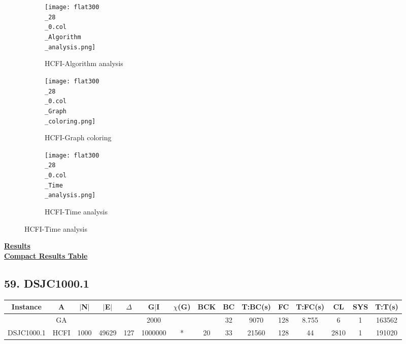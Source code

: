 \documentclass[10pt]{article}
\begin{document}
\graphicspath{{./Core1/Solutions/HCFI/flat300\_28\_0.col}}
\begin{figure}[H]
\begin{subfigure}{.33\textwidth}
  \centering
  \texttt{[image: flat300\\\_28\\\_0.col\\\_Algorithm\\\_analysis.png]}
  \caption{HCFI-Algorithm analysis}
   \label{fig:subfig1}
\end{subfigure}%
\begin{subfigure}{.33\textwidth}
  \centering
  \texttt{[image: flat300\\\_28\\\_0.col\\\_Graph\\\_coloring.png]}
  \caption{HCFI-Graph coloring}
  \label{fig:subfig2}
\end{subfigure}
\begin{subfigure}{.33\textwidth}
  \centering
  \texttt{[image: flat300\\\_28\\\_0.col\\\_Time\\\_analysis.png]}
  \caption{HCFI-Time analysis}
  \end{subfigure}
\end{figure}
\vspace{2cm}
\begin{center}
\hyperlink{page.8}{\textbf{Results}}\\
\vspace{0.5cm}
\hyperlink{page.71}{\textbf{Compact Results Table}}
\end{center}
\pagebreak
\subsection*{\hspace{0,9073976cm} 59. DSJC1000.1}
\begin{table}[H]
\centering
\begin{tabular}{|c|c|c|c|c|c|c|c|c|c|c|c|c|c|c|}
\hline
Instance& A &$|$N$|$ & $|$E$|$ & $\Delta$ & G$|$I & $\chi$(G) &BCK&BC & T:BC(s) & FC & T:FC(s) & CL & SYS & T:T(s) \\ \hline \hline

	&GA&       &                   &                     &   2000      &     \cellcolor{yellow} & {\cellcolor{yellow}}& {{\cellcolor{green}32}}
&9070   &128        &8.755                   &6                    &1          &163562        \\ \cline{2-2} \cline{6-6} \cline{9-15}
 \multirow{-2}{*}{DSJC1000.1} &HCFI   &\multirow{-2}{*}{1000}   &\multirow{-2}{*}{49629}     &\multirow{-2}{*}{127}     & 1000000    &\multirow{-2}{*}{\cellcolor{yellow}*}      & \multirow{-2}{*}{\cellcolor{yellow}20}    &{\cellcolor{green}33}     &21560         &128    &44         &2810   & 1    & 191020       \\ \hline 
\end{tabular}
\end{table}
\end{document}
